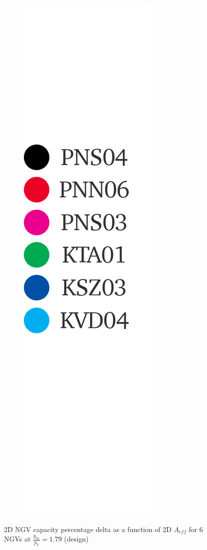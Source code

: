 \documentclass[a4paper, 11pt, oneside]{report}
\begin{document}
\begin{figure}[H]
\begin{subfigure}{.1125\textwidth}
		\includegraphics[width=\linewidth]{figs/t900_2d_capacity_trends_legend.png}
	\end{subfigure}
	\caption{2D NGV capacity percentage delta as a function of 2D $A_{eff}$ for 6 NGVs at $\frac{p_{01}}{p_2}=1.79$ (design)}
      \label{fig:T900_2d_capacities_vs_effective_throat_widths}
\end{figure}
\end{document}
